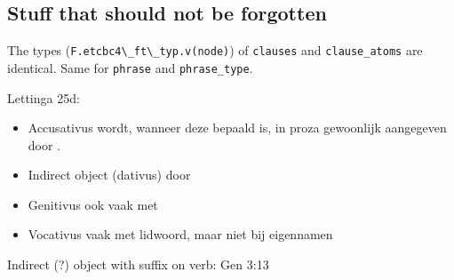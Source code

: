 \documentclass{report}
\newcommand{\mi}[1]{\lstinline{#1}}
\newcommand{\hebr}[1]{\cjRL{#1}}
\begin{document}
\subsection{Stuff that should not be forgotten}
The types (\mi{F.etcbc4\_ft\_typ.v(node)}) of \mi{clauses} and \mi{clause_atoms} are identical. Same for \mi{phrase} and \mi{phrase_type}.

Lettinga 25d:
\begin{itemize}
\item Accusativus wordt, wanneer deze bepaald is, in proza gewoonlijk aangegeven door \hebr{>T}.
\item Indirect object (dativus) door \hebr{L}
\item Genitivus ook vaak met \hebr{L}
\item Vocativus vaak met lidwoord, maar niet bij eigennamen
\end{itemize}

Indirect (?) object with suffix on verb: Gen 3:13

\end{document}
